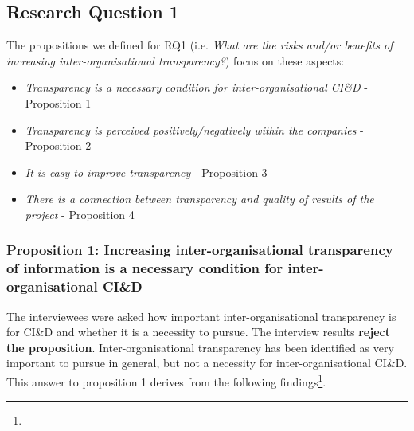 \subsection{Research Question 1}\label{sec:ResearchQuestion1}

The propositions we defined for  
RQ1 (i.e. {\em What are the risks and/or benefits of increasing inter-organisational transparency?}) focus on these aspects:

\begin{itemize}
\item {\em Transparency is a necessary condition for  inter-organisational CI\&D} - Proposition 1 %
\item {\em Transparency is perceived positively/negatively within the companies} - Proposition 2 %
\item {\em It is easy to improve transparency} - Proposition 3 %
\item {\em There is a connection between transparency and quality of results of the project} - Proposition 4 %
\end{itemize}

\vspace{.2cm}
\subsubsection{Proposition 1: Increasing inter-organisational transparency of information is a necessary condition for inter-organisational CI\&D}

The interviewees were asked how important inter-organisational transparency is for CI\&D and whether it is a necessity to pursue. 
The interview results {\bf reject the proposition}. Inter-organisational transparency has been identified as very important to pursue in general, but not a necessity for inter-organisational CI\&D. This answer to proposition 1 derives from the following findings\footnote{}.

